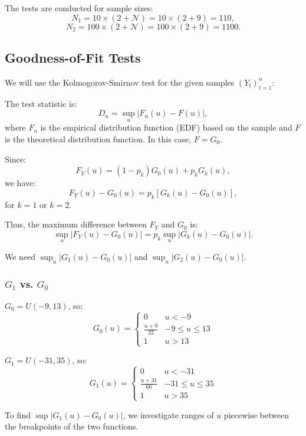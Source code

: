 \documentclass{article}
\begin{document}
The tests are conducted for sample sizes:
\[
N_1 = 10 \times (2+\mathcal{N}) = 10 \times (2+9) = 110,
\]
\[
N_2 = 100 \times (2+\mathcal{N}) = 100 \times (2+9) = 1100.
\]

\subsection{Goodness-of-Fit Tests}

We will use the Kolmogorov-Smirnov test for the given samples \((Y_t)_{t=1}^n\):

The test statistic is:
\[
D_n = \sup_u |F_n(u) - F(u)|,
\]
where \(F_n\) is the empirical distribution function (EDF) based on the sample and \(F\) is the theoretical distribution function. In this case, \(F = G_0\).

Since:
\[
F_Y(u) = (1 - p_k) G_0(u) + p_k G_k(u),
\]
we have:
\[
F_Y(u) - G_0(u) = p_k [G_k(u) - G_0(u)],
\]
for \(k=1\) or \(k=2\).

Thus, the maximum difference between \(F_Y\) and \(G_0\) is:
\[
\sup_u |F_Y(u)-G_0(u)| = p_k \sup_u |G_k(u)-G_0(u)|.
\]

We need \(\sup_u |G_1(u)-G_0(u)|\) and \(\sup_u |G_2(u)-G_0(u)|\).

\subsubsection{\(G_1\) vs. \(G_0\)}

\(G_0 = U(-9, 13)\), so:
\[
G_0(u)=\begin{cases}
0 & u < -9 \\
\frac{u+9}{22} & -9 \le u \le 13 \\
1 & u > 13
\end{cases}
\]

\(G_1 = U(-31,35)\), so:
\[
G_1(u)=\begin{cases}
0 & u < -31 \\
\frac{u+31}{66} & -31 \le u \le 35 \\
1 & u > 35
\end{cases}
\]

To find \(\sup|G_1(u)-G_0(u)|\), we investigate ranges of \(u\) piecewise between the breakpoints of the two functions.
\end{document}
